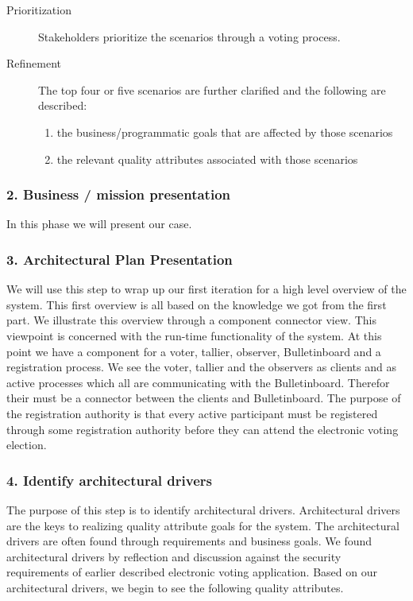 \begin{description}
    \item [Prioritization] 
  Stakeholders prioritize the scenarios through a voting process. 
    
    \item [Refinement]
        The top four or five scenarios are further clarified and the following are described:
        \begin{enumerate}
            \item the business/programmatic goals that are affected by those scenarios
            \item the relevant quality attributes associated with those scenarios   
        \end{enumerate}

   

\end{description}




\subsubsection{2. Business / mission presentation}
In this phase we will present our case.
 
\subsubsection{3. Architectural Plan Presentation}
We will use this step to wrap up our first iteration for a high level overview of the system. This first overview is all based on the knowledge we got from the first part. We illustrate this overview through a component connector view. This viewpoint is concerned with the run-time functionality of the system.  At this point we have a component for a voter, tallier, observer, Bulletinboard and a registration process. We see the voter, tallier and the observers as clients and as active processes which all are communicating with the Bulletinboard. Therefor their must be a connector between the clients and Bulletinboard. The purpose of the registration authority is that every active participant must be registered through some registration authority before they can attend the electronic voting election. 

\begin{center}
\end{center}

\subsubsection{4. Identify architectural drivers}
The purpose of this step is to identify architectural drivers. Architectural drivers are the keys to realizing quality attribute goals for the system. The architectural drivers are often found through requirements and business goals. We found architectural drivers by reflection and discussion against the security requirements of earlier described electronic voting application. Based on our architectural drivers, we begin to see the following quality attributes.\\


